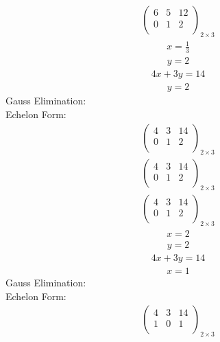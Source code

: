 \documentclass{article}
\begin{document}
\begin{align*}
\left(
\begin{array}{cc|c}
6 & 5 & 12\\
0 & 1 & 2\\
\end{array}
\right)_{2\times 3}
\end{align*}
\begin{align*}
x=\frac{1}{3}\end{align*}
\begin{align*}
y=2\end{align*}
\begin{align*}
4x + 3y=14\end{align*}
\begin{align*}
y=2\end{align*}
Gauss Elimination:\\
Echelon Form:\\
\begin{align*}
\left(
\begin{array}{cc|c}
4 & 3 & 14\\
0 & 1 & 2\\
\end{array}
\right)_{2\times 3}
\end{align*}
\begin{align*}
\left(
\begin{array}{cc|c}
4 & 3 & 14\\
0 & 1 & 2\\
\end{array}
\right)_{2\times 3}
\end{align*}
\begin{align*}
\left(
\begin{array}{cc|c}
4 & 3 & 14\\
0 & 1 & 2\\
\end{array}
\right)_{2\times 3}
\end{align*}
\begin{align*}
x=2\end{align*}
\begin{align*}
y=2\end{align*}
\begin{align*}
4x + 3y=14\end{align*}
\begin{align*}
x=1\end{align*}
Gauss Elimination:\\
Echelon Form:\\
\begin{align*}
\left(
\begin{array}{cc|c}
4 & 3 & 14\\
1 & 0 & 1\\
\end{array}
\right)_{2\times 3}
\end{align*}
\end{document}
